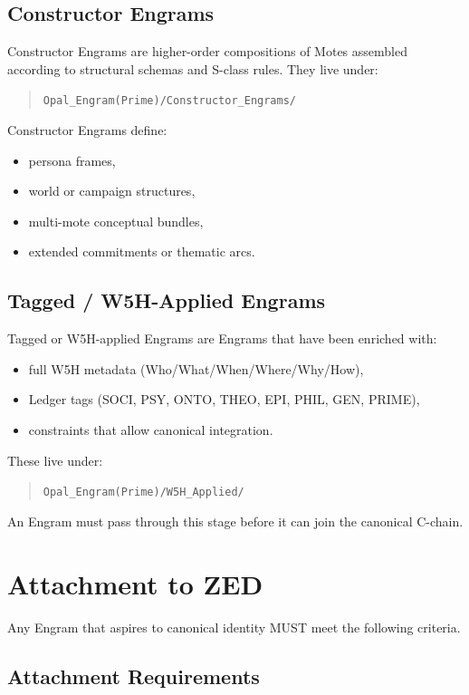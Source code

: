 \subsection{Constructor Engrams}

Constructor Engrams are higher-order compositions of Motes assembled according to
structural schemas and S-class rules. They live under:
\begin{quote}
\texttt{Opal\_Engram(Prime)/Constructor\_Engrams/}
\end{quote}

Constructor Engrams define:
\begin{itemize}
    \item persona frames,
    \item world or campaign structures,
    \item multi-mote conceptual bundles,
    \item extended commitments or thematic arcs.
\end{itemize}

\subsection{Tagged / W5H-Applied Engrams}

Tagged or W5H-applied Engrams are Engrams that have been enriched with:
\begin{itemize}
    \item full W5H metadata (Who/What/When/Where/Why/How),
    \item Ledger tags (SOCI, PSY, ONTO, THEO, EPI, PHIL, GEN, PRIME),
    \item constraints that allow canonical integration.
\end{itemize}

These live under:
\begin{quote}
\texttt{Opal\_Engram(Prime)/W5H\_Applied/}
\end{quote}

An Engram must pass through this stage before it can join the canonical C-chain.

\section{Attachment to ZED}

Any Engram that aspires to canonical identity MUST meet the following criteria.

\subsection{Attachment Requirements}

